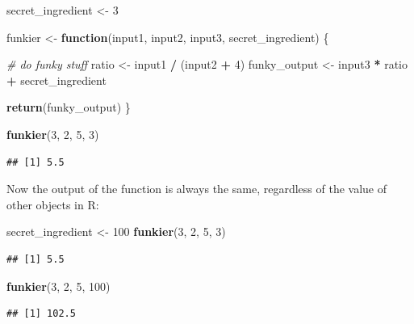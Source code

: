 \documentclass[
]{book}
\newenvironment{Shaded}{\begin{snugshade}}{\end{snugshade}}
\newcommand{\CommentTok}[1]{\textcolor[rgb]{0.56,0.35,0.01}{\textit{#1}}}
\newcommand{\ControlFlowTok}[1]{\textcolor[rgb]{0.13,0.29,0.53}{\textbf{#1}}}
\newcommand{\DecValTok}[1]{\textcolor[rgb]{0.00,0.00,0.81}{#1}}
\newcommand{\FunctionTok}[1]{\textcolor[rgb]{0.13,0.29,0.53}{\textbf{#1}}}
\newcommand{\NormalTok}[1]{#1}
\newcommand{\OtherTok}[1]{\textcolor[rgb]{0.56,0.35,0.01}{#1}}
\newcommand{\SpecialCharTok}[1]{\textcolor[rgb]{0.81,0.36,0.00}{\textbf{#1}}}
\begin{document}
\begin{Shaded}
\begin{Highlighting}[]
\NormalTok{secret\_ingredient }\OtherTok{\textless{}{-}} \DecValTok{3}

\NormalTok{funkier }\OtherTok{\textless{}{-}} \ControlFlowTok{function}\NormalTok{(input1, input2, input3, secret\_ingredient) \{}
  
  \CommentTok{\# do funky stuff}
\NormalTok{  ratio }\OtherTok{\textless{}{-}}\NormalTok{ input1 }\SpecialCharTok{/}\NormalTok{ (input2 }\SpecialCharTok{+} \DecValTok{4}\NormalTok{)}
\NormalTok{  funky\_output }\OtherTok{\textless{}{-}}\NormalTok{ input3 }\SpecialCharTok{*}\NormalTok{ ratio }\SpecialCharTok{+}\NormalTok{ secret\_ingredient}
  
  \FunctionTok{return}\NormalTok{(funky\_output)  }
\NormalTok{\}}

\FunctionTok{funkier}\NormalTok{(}\DecValTok{3}\NormalTok{, }\DecValTok{2}\NormalTok{, }\DecValTok{5}\NormalTok{, }\DecValTok{3}\NormalTok{)}
\end{Highlighting}
\end{Shaded}

\begin{verbatim}
## [1] 5.5
\end{verbatim}

Now the output of the function is always the same, regardless of the value of other objects in R:

\begin{Shaded}
\begin{Highlighting}[]
\NormalTok{secret\_ingredient }\OtherTok{\textless{}{-}} \DecValTok{100}
\FunctionTok{funkier}\NormalTok{(}\DecValTok{3}\NormalTok{, }\DecValTok{2}\NormalTok{, }\DecValTok{5}\NormalTok{, }\DecValTok{3}\NormalTok{)}
\end{Highlighting}
\end{Shaded}

\begin{verbatim}
## [1] 5.5
\end{verbatim}

\begin{Shaded}
\begin{Highlighting}[]
\FunctionTok{funkier}\NormalTok{(}\DecValTok{3}\NormalTok{, }\DecValTok{2}\NormalTok{, }\DecValTok{5}\NormalTok{, }\DecValTok{100}\NormalTok{)}
\end{Highlighting}
\end{Shaded}

\begin{verbatim}
## [1] 102.5
\end{verbatim}
\end{document}
